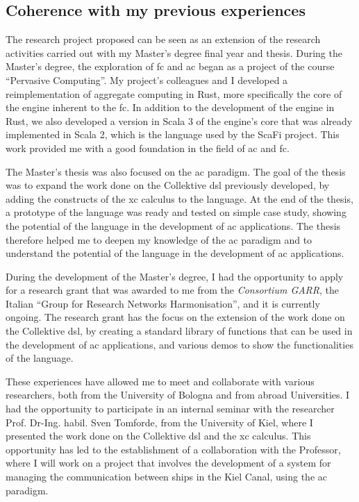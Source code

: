 \documentclass[12pt, a4paper]{article}
\begin{document}
\subsection{Coherence with my previous experiences}
\label{subsec:coherence-with-the-educational-path}

The research project proposed can be seen as an extension of the research activities
carried out with my Master's degree final year and thesis.
%
During the Master's degree,
the exploration of \ac{fc} and \ac{ac} began as a project of the course ``Pervasive Computing''.
%
My project's colleagues and I developed a reimplementation of aggregate computing in Rust,
more specifically the core of the engine inherent to the \ac{fc}.
%
In addition to the development of the engine in Rust,
we also developed a version in Scala 3 of the engine's core that was already implemented in Scala 2,
which is the language used by the ScaFi project.
%
This work provided me with a good foundation in the field of \ac{ac} and \ac{fc}.

The Master's thesis was also focused on the \ac{ac} paradigm.
%
The goal of the thesis was to expand the work done on the Collektive \ac{dsl} previously developed,
by adding the constructs of the \ac{xc} calculus to the language.
%
At the end of the thesis, a prototype of the language was ready and tested on simple case study,
showing the potential of the language in the development of \ac{ac} applications.
%
The thesis therefore helped me to deepen my knowledge of the \ac{ac} paradigm and to understand the potential
of the language in the development of \ac{ac} applications.

During the development of the Master's degree,
I had the opportunity to apply for a research grant that was awarded to me from the \emph{Consortium GARR},
the Italian ``Group for Research Networks Harmonisation'',
and it is currently ongoing.
%
The research grant has the focus on the extension of the work done on the Collektive \ac{dsl},
by creating a standard library of functions that can be used in the development of \ac{ac} applications,
and various demos to show the functionalities of the language.

These experiences have allowed me to meet and collaborate with various researchers,
both from the University of Bologna and from abroad Universities.
%
I had the opportunity to participate in an internal seminar with the researcher Prof. Dr-Ing. habil. Sven Tomforde,
from the University of Kiel,
where I presented the work done on the Collektive \ac{dsl} and the \ac{xc} calculus.
%
This opportunity has led to the establishment of a collaboration with the Professor,
where I will work on a project that involves the development of a system for managing the communication between ships in the Kiel Canal,
using the \ac{ac} paradigm.
\end{document}
